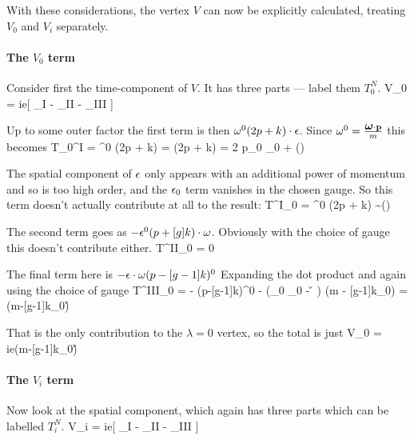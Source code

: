 With these considerations, the vertex $V$ can now be explicitly calculated, treating $V_0$ and $V_i$ separately.

\paragraph{The $V_0$ term}
Consider first the time-component of $V$.  It has three parts --- label them $T_0^N$.
\beq 
	V_0 = ie[ _I 
			- _{II}
			- _{III} ]
\eeq	

Up to some outer factor the first term is then $\omega^0 (2p + k) \cdot \epsilon$.  Since $\omega^0 =\frac{\mbox{\boldmath$ \omega $} \cdot \mathbf{p}}{m}$ this becomes
\beq
T_0^I = \W^0 (2p + k) \cdot \A =  (2p + k) \cdot \A  = 2  p_0  \A_0 + ()
\eeq

The spatial component of $\epsilon$ only appears with an additional power of momentum and so is too high order, and the $\epsilon_0$ term vanishes in the chosen gauge.  So this term doesn't actually contribute at all to the result:
\beq
T^{I}_0 = \W^0 (2p + k) \cdot \A \sim {}()
\eeq

The second term goes as $ -\epsilon^0 (p+[g]k) \cdot \omega$.   Obviously with the choice of gauge this doesn't contribute either.
\beq
	T^{II}_0 = 0
\eeq	

The final term here is $- \epsilon \cdot \omega (p-[g-1]k)^0 $  Expanding the dot product and again using the choice of gauge
\beq
	T^{III}_0 = - \A \cdot \W (p-[g-1]k)^0   \approx - (\A_0 \W_0  - \v{\A} \cdot \gv{\W} ) (m - [g-1]k_0) = (m-[g-1]k_0)\v{\A} \cdot \gv{\W}
\eeq

That is the only contribution to the $\lambda=0$ vertex, so the total is just 
\beq \label{eq:S1:V0vertex}
	V_0 = ie(m-[g-1]k_0)\v{\A} \cdot \gv{\W}
\eeq

\paragraph{The $V_i$ term}
Now look at the spatial component, which again has three parts which can be labelled $T^N_i$.
\beq
 V_i = ie[ _I
 	 - _{II}
 	  - _{III} ]
\eeq

